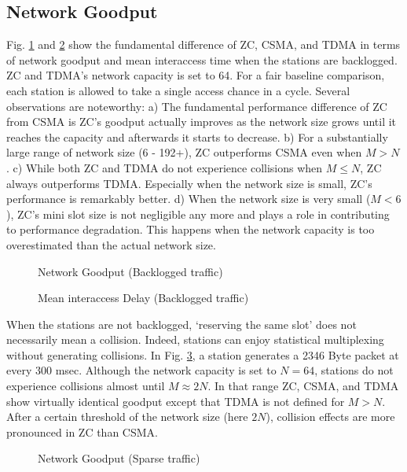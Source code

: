 \documentclass{acm_proc_article-sp}
\begin{document}
\subsection{Network Goodput}
Fig. \ref{fig.backloggedgoodput} and \ref{fig.backloggeddelay} show the fundamental difference of ZC, CSMA, and TDMA in terms of network goodput and mean interaccess time when the stations are backlogged. ZC and TDMA's network capacity is set to 64. For a fair baseline comparison, each station is allowed to take a single access chance in a cycle. Several observations are noteworthy: a) The fundamental performance difference of ZC from CSMA is ZC's goodput actually improves as the network size grows until it reaches the capacity and afterwards it starts to decrease. b) For a substantially large range of network size (6 - 192+), ZC outperforms CSMA even when $M > N$. c) While both ZC and TDMA do not experience collisions when $M \le N$, ZC always outperforms TDMA. Especially when the network size is small, ZC's performance is remarkably better. d) When the network size is very small ($M < 6$), ZC's mini slot size is not negligible any more and plays a role in contributing to performance degradation. This happens when the network capacity is too overestimated than the actual network size.
\begin{figure}[ht]
    \begin{center}
    \caption{Network Goodput (Backlogged traffic)} \label{fig.backloggedgoodput}
    \end{center}
\end{figure}
\begin{figure}[ht]
    \begin{center}
    \caption{Mean interaccess Delay (Backlogged traffic)} \label{fig.backloggeddelay}
    \end{center}
\end{figure}
When the stations are not backlogged, `reserving the same slot' does not necessarily mean a collision. Indeed, stations can enjoy statistical multiplexing without generating collisions. In Fig. \ref{fig.sparsegoodput}, a station generates a 2346 Byte packet at every 300 msec. Although the network capacity is set to $N=64$, stations do not experience collisions almost until $M \approx 2N$. In that range ZC, CSMA, and TDMA show virtually identical goodput except that TDMA is not defined for $M > N$. After a certain threshold of the network size (here $2N$), collision effects are more pronounced in ZC than CSMA.
\begin{figure}[ht]
    \begin{center}
    \caption{Network Goodput (Sparse traffic)} \label{fig.sparsegoodput}
    \end{center}
\vspace{-0.2in}
\end{figure}
\end{document}
